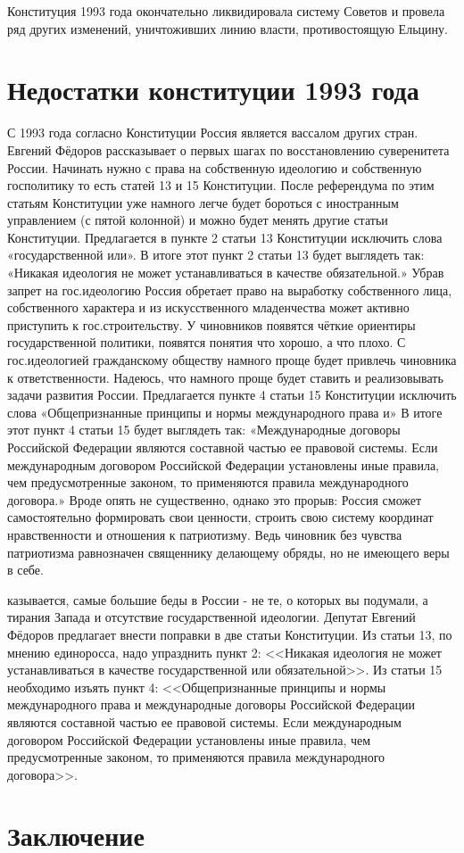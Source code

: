 \documentclass[a4paper,12pt]{diss_4}
\begin{document}
Конституция 1993 года окончательно ликвидировала систему Советов и провела ряд других изменений, уничтоживших линию власти, противостоящую Ельцину.

\chapter{Недостатки конституции 1993 года}

С 1993 года согласно Конституции Россия является вассалом других стран. Евгений Фёдоров рассказывает о первых шагах по восстановлению суверенитета России. Начинать нужно с права на собственную идеологию и собственную госполитику то есть статей 13 и 15 Конституции. После референдума по этим статьям Конституции уже намного легче будет бороться с иностранным управлением (с пятой колонной) и можно будет менять другие статьи Конституции.
Предлагается в пункте 2 статьи 13 Конституции исключить слова «государственной или».
В итоге этот пункт 2 статьи 13 будет выглядеть так: «Никакая идеология не может устанавливаться в качестве обязательной.» 
Убрав запрет на гос.идеологию Россия обретает право на выработку собственного лица, собственного характера и из искусственного младенчества может активно приступить к гос.строительству. У чиновников появятся чёткие ориентиры государственной политики, появятся понятия что хорошо, а что плохо. С гос.идеологией гражданскому обществу намного проще будет привлечь чиновника к ответственности. Надеюсь, что намного проще будет ставить и реализовывать задачи развития России.
Предлагается пункте 4 статьи 15 Конституции исключить слова «Общепризнанные принципы и нормы международного права и»
В итоге этот пункт 4 статьи 15 будет выглядеть так: «Международные договоры Российской Федерации являются составной частью ее правовой системы. Если международным договором Российской Федерации установлены иные правила, чем предусмотренные законом, то применяются правила международного договора.» 
Вроде опять не существенно, однако это прорыв: Россия сможет самостоятельно формировать свои ценности, строить свою систему координат нравственности и отношения к патриотизму. Ведь чиновник без чувства патриотизма равнозначен священнику делающему обряды, но не имеющего веры в себе.


казывается, самые большие беды в России - не те, о которых вы подумали, а тирания Запада и отсутствие государственной идеологии. Депутат Евгений Фёдоров предлагает внести поправки в две статьи Конституции. Из статьи 13, по мнению единоросса, надо упразднить пункт 2: <<Никакая идеология не может устанавливаться в качестве государственной или обязательной>>. Из статьи 15 необходимо изъять пункт 4: <<Общепризнанные принципы и нормы международного права и международные договоры Российской Федерации являются составной частью ее правовой системы. Если международным договором Российской Федерации установлены иные правила, чем предусмотренные законом, то применяются правила международного договора>>.

\chapter*{Заключение}


\begin{thebibliography}{99}



\end{thebibliography}
\end{document}
